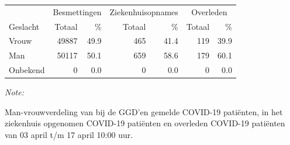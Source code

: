 \documentclass[
  english,
  man,floatsintext]{apa6}
\begin{document}
\begin{table}
\centering\begingroup\fontsize{11}{13}\selectfont

\begin{threeparttable}
\begin{tabular}{lrrrrrr}
\toprule
\multicolumn{1}{c}{ } & \multicolumn{2}{c}{Besmettingen} & \multicolumn{2}{c}{Ziekenhuisopnames} & \multicolumn{2}{c}{Overleden} \\
\cmidrule(l{3pt}r{3pt}){2-3} \cmidrule(l{3pt}r{3pt}){4-5} \cmidrule(l{3pt}r{3pt}){6-7}
Geslacht & Totaal & \% & Totaal & \% & Totaal & \%\\
\midrule
Vrouw & 49887 & 49.9 & 465 & 41.4 & 119 & 39.9\\
Man & 50117 & 50.1 & 659 & 58.6 & 179 & 60.1\\
Onbekend & 0 & 0.0 & 0 & 0.0 & 0 & 0.0\\
\bottomrule
\end{tabular}
\begin{tablenotes}
\item \textit{Note: } 
\item Man-vrouwverdeling van bij de GGD’en gemelde COVID-19 patiënten, in het ziekenhuis opgenomen COVID-19 patiënten en overleden COVID-19 patiënten van 03 april t/m 17 april 10:00 uur.
\end{tablenotes}
\end{threeparttable}
\endgroup{}
\end{table}
\newpage
\end{document}
